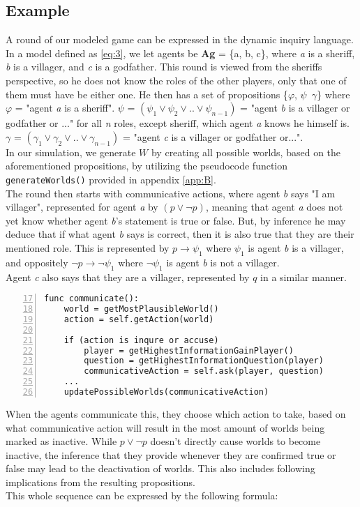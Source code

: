 \subsection{Example}
A round of our modeled game can be expressed in the dynamic inquiry language. 
In a model defined as \cref{eq:3}, we let agents be \textbf{Ag} = \{a, b, c\}, 
where \textit{a} is a sheriff, \textit{b} is a villager, and \textit{c} is a 
godfather. This round is viewed from the sheriffs perspective, so he does not 
know the roles of the other players, only that one of them must have be either 
one. He then has a set of propositions \{$\varphi$, $\psi$\, $\gamma$\} 
where 
$\varphi$ = "agent \textit{a} 
is a sheriff". $\psi$ = $(\psi_1 \lor \psi_2 \lor .. 
\lor \psi_{n-1})$ = "agent \textit{b} is a villager or godfather or ..." for 
all 
\textit{n} roles, except sheriff, which agent \textit{a} knows he himself is. 
$\gamma$ = $(\gamma_1 \lor 
\gamma_2 \lor .. \lor \gamma_{n-1}) $ = "agent \textit{c} is a villager or 
godfather or...". \\
In our simulation, we generate $W$ by 
creating all possible worlds, based on the aforementioned propositions, by 
utilizing the pseudocode function \lstinline{generateWorlds()} provided in 
appendix \ref{app:B}. \\
The round then starts with communicative actions, where agent \textit{b} says 
"I am villager", represented for agent \textit{a} by $(p \lor \neg p)$, meaning 
that agent \textit{a} does not yet know whether agent \textit{b}'s statement is 
true or false. But, by inference he may deduce that if what agent \textit{b} 
says is correct, then it is also true that they are their mentioned role. This 
is represented by $p \rightarrow \psi_1$ where $\psi_1$ is agent 
\textit{b} is a villager, and oppositely $\neg p \rightarrow \neg \psi_1$ where 
$\neg \psi_1$ is agent 
\textit{b} is not a villager. \\
Agent \textit{c} also says that they are a 
villager, 
represented by $q$ in a similar manner. 

\begin{lstlisting}[basicstyle=\footnotesize\ttfamily, numbers=left, xleftmargin=0.5cm, firstnumber=17, caption={Snippet from appendix C}, captionpos=b]
func communicate():
	world = getMostPlausibleWorld()
	action = self.getAction(world)
	
	if (action is inqure or accuse)
		player = getHighestInformationGainPlayer()
		question = getHighestInformationQuestion(player)
		communicativeAction = self.ask(player, question)
	...
	updatePossibleWorlds(communicativeAction)
\end{lstlisting}\label{lst:communicate}
When the agents communicate this, they choose which action to take, based on 
what communicative action will result in the most amount of worlds being marked 
as inactive. While $p \lor \neg p$ doesn't directly cause worlds to become 
inactive, the inference that they provide whenever they are confirmed true or 
false may lead to the deactivation of worlds. This also includes following 
implications from the resulting propositions.\\
This whole sequence can be expressed by the following formula:

